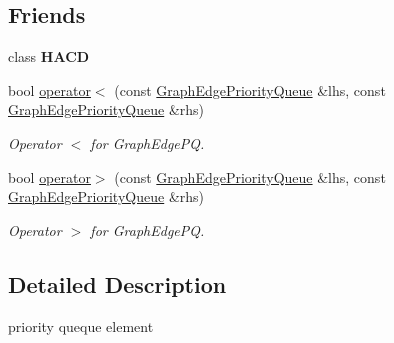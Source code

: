\subsection*{Friends}
\begin{DoxyCompactItemize}
\item 
\hypertarget{class_h_a_c_d_1_1_graph_edge_priority_queue_ab3497bc7797561d0c79ecef2f462e43a}{class {\bfseries H\+A\+C\+D}}\label{class_h_a_c_d_1_1_graph_edge_priority_queue_ab3497bc7797561d0c79ecef2f462e43a}

\item 
\hypertarget{class_h_a_c_d_1_1_graph_edge_priority_queue_ac317f66c2b5f3f4f85374fe36a240f3c}{bool \hyperlink{class_h_a_c_d_1_1_graph_edge_priority_queue_ac317f66c2b5f3f4f85374fe36a240f3c}{operator$<$} (const \hyperlink{class_h_a_c_d_1_1_graph_edge_priority_queue}{Graph\+Edge\+Priority\+Queue} \&lhs, const \hyperlink{class_h_a_c_d_1_1_graph_edge_priority_queue}{Graph\+Edge\+Priority\+Queue} \&rhs)}\label{class_h_a_c_d_1_1_graph_edge_priority_queue_ac317f66c2b5f3f4f85374fe36a240f3c}

\begin{DoxyCompactList}\small\item\em Operator $<$ for Graph\+Edge\+P\+Q. \end{DoxyCompactList}\item 
\hypertarget{class_h_a_c_d_1_1_graph_edge_priority_queue_a65cb937f9362cbd46fb792aa2edaf74d}{bool \hyperlink{class_h_a_c_d_1_1_graph_edge_priority_queue_a65cb937f9362cbd46fb792aa2edaf74d}{operator$>$} (const \hyperlink{class_h_a_c_d_1_1_graph_edge_priority_queue}{Graph\+Edge\+Priority\+Queue} \&lhs, const \hyperlink{class_h_a_c_d_1_1_graph_edge_priority_queue}{Graph\+Edge\+Priority\+Queue} \&rhs)}\label{class_h_a_c_d_1_1_graph_edge_priority_queue_a65cb937f9362cbd46fb792aa2edaf74d}

\begin{DoxyCompactList}\small\item\em Operator $>$ for Graph\+Edge\+P\+Q. \end{DoxyCompactList}\end{DoxyCompactItemize}


\subsection{Detailed Description}
priority queque element 

